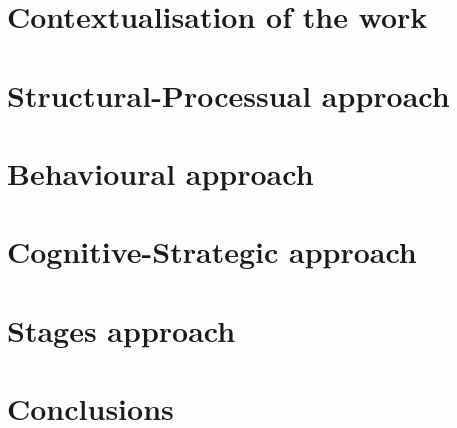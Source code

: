 \documentclass[12pt]{report}
\begin{document}
\chapter{Contextualisation of the work}


\chapter{Structural-Processual approach}


\chapter{Behavioural approach}


\chapter{Cognitive-Strategic approach}


\chapter{Stages approach}


\chapter{Conclusions}


%
\printbibliography[title={Bibliography}]
\end{document}
